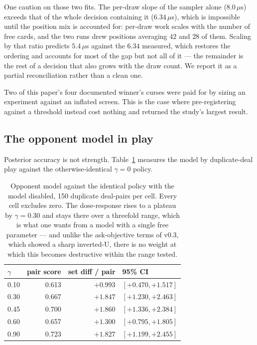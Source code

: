 \documentclass[11pt,a4paper]{article}
\begin{document}
One caution on those two fits. The per-draw slope of the sampler alone
($8.0\,\mu$s) exceeds that of the whole decision containing it ($6.34\,\mu$s),
which is impossible until the position mix is accounted for: per-draw work scales
with the number of free cards, and the two runs drew positions averaging $42$ and
$28$ of them. Scaling by that ratio predicts $5.4\,\mu$s against the $6.34$
measured, which restores the ordering and accounts for most of the gap but not
all of it --- the remainder is the rest of a decision that also grows with the
draw count. We report it as a partial reconciliation rather than a clean one.

Two of this paper's four documented winner's curses were paid for by sizing an
experiment against an inflated screen. This is the case where pre-registering
against a threshold instead cost nothing and returned the study's largest
result.

\subsection{The opponent model in play}
\label{sec:res-oppmodel}

Posterior accuracy is not strength. Table~\ref{tab:gamma} measures the model by
duplicate-deal play against the otherwise-identical $\gamma = 0$ policy.

\begin{table}[t]
\centering
\small
\begin{tabular}{lrrl}
\toprule
$\gamma$ & pair score & set diff / pair & 95\% CI \\
\midrule
0.10 & 0.613 & $+0.993$ & $[+0.470, +1.517]$ \\
0.30 & 0.667 & $+1.847$ & $[+1.230, +2.463]$ \\
0.45 & 0.700 & $+1.860$ & $[+1.336, +2.384]$ \\
0.60 & 0.657 & $+1.300$ & $[+0.795, +1.805]$ \\
0.90 & 0.723 & $+1.827$ & $[+1.199, +2.455]$ \\
\bottomrule
\end{tabular}
\caption{Opponent model against the identical policy with the model disabled,
150 duplicate deal-pairs per cell. Every cell excludes zero. The dose-response
rises to a plateau by $\gamma = 0.30$ and stays there over a threefold range,
which is what one wants from a model with a single free parameter --- and unlike
the ask-objective terms of v0.3, which showed a sharp inverted-U, there is no
weight at which this becomes destructive within the range tested.}
\label{tab:gamma}
\end{table}
\end{document}
